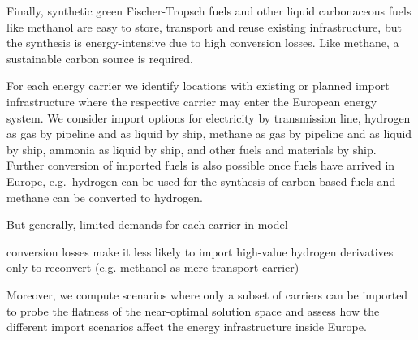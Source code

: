Finally, synthetic green Fischer-Tropsch fuels and other liquid carbonaceous
fuels like methanol are easy to store, transport and reuse existing
infrastructure, but the synthesis is energy-intensive due to high conversion
losses. Like methane, a sustainable carbon source is required. 


For each energy carrier we identify locations with existing or planned import
infrastructure where the respective carrier may enter the European energy
system. We consider import options for electricity by transmission line,
hydrogen as gas by pipeline and as liquid by ship, methane as gas by pipeline
and as liquid by ship, ammonia as liquid by ship, and other fuels and materials
by ship. Further conversion of imported fuels is also possible once fuels have
arrived in Europe, e.g.~hydrogen can be used for the synthesis of carbon-based
fuels and methane can be converted to hydrogen.

But generally, limited demands for each carrier in model

conversion losses make it less likely to import high-value hydrogen derivatives only to reconvert (e.g. methanol as mere transport carrier)

Moreover, we compute scenarios where only a subset of carriers can be imported
to probe the flatness of the near-optimal solution space and assess how the
different import scenarios affect the energy infrastructure inside Europe.

